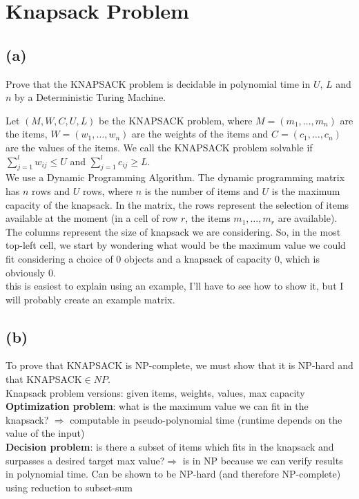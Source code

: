 

\setcounter{section}{1}


\section{Knapsack Problem}

\subsection{(a)}

Prove that the \textsc{KNAPSACK} problem is decidable in polynomial time in $U$, $L$ and $n$ by a Deterministic Turing Machine.

Let $(M,W,C,U,L)$ be the \textsc{KNAPSACK} problem, where $M = (m_{1},\ldots,m_{n})$ are the items, $W = (w_{1},\ldots,w_{n})$ are the weights of the items and $C=(c_{1},\ldots,c_{n})$ are the values of the items. We call the \textsc{KNAPSACK} problem solvable if $\sum_{j=1}^{l}w_{ij} \leq U$ and $\sum_{j=1}^{l}c_{ij}\geq L$.\\
We use a Dynamic Programming Algorithm. The dynamic programming matrix has $n$ rows and $U$ rows, where $n$ is the number of items and $U$ is the maximum capacity of the knapsack. In the matrix, the rows represent the selection of items available at the moment (in a cell of row $r$, the items $m_{1},\ldots,m_{r}$ are available). The columns represent the size of knapsack we are considering. So, in the most top-left cell, we start by wondering what would be the maximum value we could fit considering a choice of $0$ objects and a knapsack of capacity $0$, which is obviously $0$.\\
{\color{red} this is easiest to explain using an example, I'll have to see how to show it, but I will probably create an example matrix.}

\subsection{(b)}

To prove that \textsc{KNAPSACK} is \textsc{NP}-complete, we must show that it is \textsc{NP}-hard and that \textsc{KNAPSACK}$\in NP$.\\
{\color{red}Knapsack problem versions: given items, weights, values, max capacity\\
\textbf{Optimization problem}: what is the maximum value we can fit in the knapsack? $\Rightarrow$ computable in pseudo-polynomial time (runtime depends on the value of the input)\\
\textbf{Decision problem}: is there a subset of items which fits in the knapsack and surpasses a desired target max value?$\Rightarrow$ is in NP because we can verify results in polynomial time. Can be shown to be NP-hard (and therefore NP-complete) using reduction to subset-sum}

